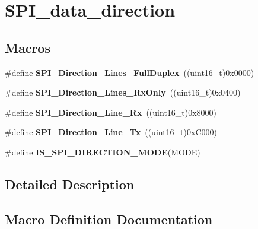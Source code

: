 \hypertarget{group___s_p_i__data__direction}{}\section{S\+P\+I\+\_\+data\+\_\+direction}
\label{group___s_p_i__data__direction}
\subsection*{Macros}
\begin{DoxyCompactItemize}
\item 
\hypertarget{group___s_p_i__data__direction_gab6bdb82e315a90210c4425c46bbdf5f1}{}\#define {\bfseries S\+P\+I\+\_\+\+Direction\+\_\+Lines\+\_\+\+Full\+Duplex}~((uint16\+\_\+t)0x0000)\label{group___s_p_i__data__direction_gab6bdb82e315a90210c4425c46bbdf5f1}

\item 
\hypertarget{group___s_p_i__data__direction_gab8ab942f7240394f50e4c86c5288516a}{}\#define {\bfseries S\+P\+I\+\_\+\+Direction\+\_\+Lines\+\_\+\+Rx\+Only}~((uint16\+\_\+t)0x0400)\label{group___s_p_i__data__direction_gab8ab942f7240394f50e4c86c5288516a}

\item 
\hypertarget{group___s_p_i__data__direction_ga42ea8306cfc1f23ffc51efae6f66320e}{}\#define {\bfseries S\+P\+I\+\_\+\+Direction\+\_\+Line\+\_\+\+Rx}~((uint16\+\_\+t)0x8000)\label{group___s_p_i__data__direction_ga42ea8306cfc1f23ffc51efae6f66320e}

\item 
\hypertarget{group___s_p_i__data__direction_ga70cc710a771065b2ed11c2ac9697defe}{}\#define {\bfseries S\+P\+I\+\_\+\+Direction\+\_\+Line\+\_\+\+Tx}~((uint16\+\_\+t)0x\+C000)\label{group___s_p_i__data__direction_ga70cc710a771065b2ed11c2ac9697defe}

\item 
\#define {\bfseries I\+S\+\_\+\+S\+P\+I\+\_\+\+D\+I\+R\+E\+C\+T\+I\+O\+N\+\_\+\+M\+O\+D\+E}(M\+O\+D\+E)
\end{DoxyCompactItemize}


\subsection{Detailed Description}


\subsection{Macro Definition Documentation}
\hypertarget{group___s_p_i__data__direction_ga536857c68ce1d9806c04046707448b3e}{}

